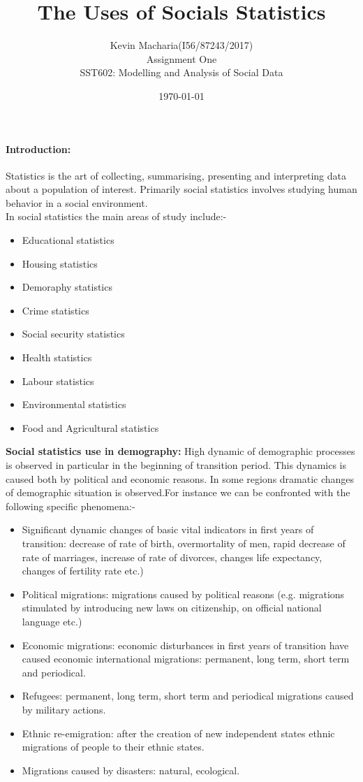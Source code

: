 \documentclass[11pt]{article}
\title{The Uses of  Socials Statistics}
\author{Kevin Macharia(I56/87243/2017) \\ Assignment One \\ SST602: Modelling and Analysis of Social Data}
\date{\today}
\begin{document}
\maketitle
\paragraph{Introduction:}Statistics is the art of collecting, summarising, presenting and interpreting data about a population of interest. Primarily social statistics involves studying human behavior in a social environment. \\
In social statistics the main areas of study include:-

\begin{itemize}
\item Educational statistics
\item Housing statistics
\item Demoraphy statistics
\item Crime statistics
\item Social security statistics
\item Health statistics
\item Labour statistics
\item Environmental statistics
\item Food and Agricultural statistics  
\end{itemize}
\textbf{Social statistics use in demography:} High dynamic of demographic processes is observed in particular in the beginning of transition period. This dynamics is caused both by political and economic reasons. In some regions dramatic changes of demographic situation is observed.For instance we can be confronted with the following specific phenomena:-
\begin{itemize}
\item Significant dynamic changes of basic vital indicators in first years of transition: decrease of rate of birth, overmortality of men, rapid decrease of rate of marriages, increase of rate of divorces, changes life expectancy, changes of fertility rate etc.)
\item Political migrations: migrations caused by political reasons (e.g. migrations stimulated by introducing new laws on citizenship, on official national language etc.)
\item Economic migrations: economic disturbances in first years of transition have caused economic international migrations: permanent, long term, short term and periodical.
\item Refugees: permanent, long term, short term and periodical migrations caused by military actions.
\item Ethnic re-emigration: after the creation of new independent states ethnic migrations of people to their ethnic states.
\item Migrations caused by disasters: natural, ecological.
\end{itemize}
\end{document}

